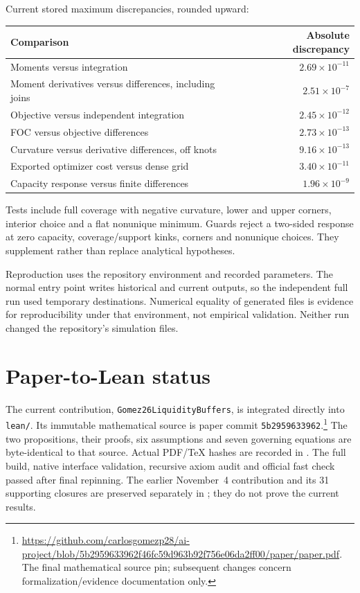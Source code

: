 \documentclass[11pt]{article}
\theoremstyle{definition}
\begin{document}
Current stored maximum discrepancies, rounded upward:
\begin{center}
\begin{tabular}{lr}
\toprule Comparison & Absolute discrepancy\\ \midrule
Moments versus integration & $2.69\times10^{-11}$\\
Moment derivatives versus differences, including joins & $2.51\times10^{-7}$\\
Objective versus independent integration & $2.45\times10^{-12}$\\
FOC versus objective differences & $2.73\times10^{-13}$\\
Curvature versus derivative differences, off knots & $9.16\times10^{-13}$\\
Exported optimizer cost versus dense grid & $3.40\times10^{-11}$\\
Capacity response versus finite differences & $1.96\times10^{-9}$\\
\bottomrule
\end{tabular}
\end{center}
Tests include full coverage with negative curvature, lower and upper corners, interior choice and a flat nonunique minimum. Guards reject a two-sided response at zero capacity, coverage/support kinks, corners and nonunique choices. They supplement rather than replace analytical hypotheses.

Reproduction uses the repository environment and recorded parameters. The normal entry point writes historical and current outputs, so the independent full run used temporary destinations. Numerical equality of generated files is evidence for reproducibility under that environment, not empirical validation. Neither run changed the repository's simulation files.

\section{Paper-to-Lean status}\label{app:lean}
The current contribution, \texttt{Gomez26LiquidityBuffers}, is integrated directly into \texttt{lean/}. Its immutable mathematical source is paper commit \texttt{5b2959633962}.\footnote{\raggedright\url{https://github.com/carlosgomezp28/ai-project/blob/5b2959633962f46fc59d963b92f756e06da2ff00/paper/paper.pdf}. The final mathematical source pin; subsequent changes concern formalization/evidence documentation only.\par} The two propositions, their proofs, six assumptions and seven governing equations are byte-identical to that source. Actual PDF/TeX hashes are recorded in . The full build, native interface validation, recursive axiom audit and official fast check passed after final repinning. The earlier November~4 contribution and its 31 supporting closures are preserved separately in ; they do not prove the current results.
\end{document}
